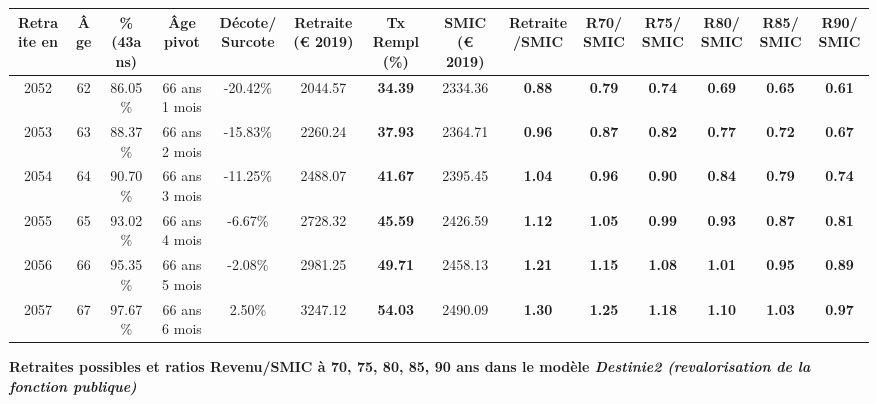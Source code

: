 \begin{adjustbox}{max width=\textwidth} 
\begin{tabular}[htb]{|c|c||c|c|c||c|c||c|c||c|c|c|c|c|} 
\hline 
 Retraite en &  Âge &  \%(43ans) &  Âge pivot &  Décote/Surcote &  Retraite (\euro{} 2019) &  Tx Rempl(\%) &  SMIC (\euro{} 2019) &  Retraite/SMIC &  R70/SMIC &  R75/SMIC &  R80/SMIC &  R85/SMIC &  R90/SMIC \\ 
\hline \hline 
 2052 &  62 &  86.05\% &  66 ans 1 mois &  -20.42\% &  2044.57 &  {\bf 34.39} &  2334.36 &  {\bf {\color{red} 0.88}} &  {\bf {\color{red} 0.79}} &  {\bf {\color{red} 0.74}} &  {\bf {\color{red} 0.69}} &  {\bf {\color{red} 0.65}} &  {\bf {\color{red} 0.61}} \\ 
\hline 
 2053 &  63 &  88.37\% &  66 ans 2 mois &  -15.83\% &  2260.24 &  {\bf 37.93} &  2364.71 &  {\bf {\color{red} 0.96}} &  {\bf {\color{red} 0.87}} &  {\bf {\color{red} 0.82}} &  {\bf {\color{red} 0.77}} &  {\bf {\color{red} 0.72}} &  {\bf {\color{red} 0.67}} \\ 
\hline 
 2054 &  64 &  90.70\% &  66 ans 3 mois &  -11.25\% &  2488.07 &  {\bf 41.67} &  2395.45 &  {\bf 1.04} &  {\bf {\color{red} 0.96}} &  {\bf {\color{red} 0.90}} &  {\bf {\color{red} 0.84}} &  {\bf {\color{red} 0.79}} &  {\bf {\color{red} 0.74}} \\ 
\hline 
 2055 &  65 &  93.02\% &  66 ans 4 mois &  -6.67\% &  2728.32 &  {\bf 45.59} &  2426.59 &  {\bf 1.12} &  {\bf 1.05} &  {\bf {\color{red} 0.99}} &  {\bf {\color{red} 0.93}} &  {\bf {\color{red} 0.87}} &  {\bf {\color{red} 0.81}} \\ 
\hline 
 2056 &  66 &  95.35\% &  66 ans 5 mois &  -2.08\% &  2981.25 &  {\bf 49.71} &  2458.13 &  {\bf 1.21} &  {\bf 1.15} &  {\bf 1.08} &  {\bf 1.01} &  {\bf {\color{red} 0.95}} &  {\bf {\color{red} 0.89}} \\ 
\hline 
 2057 &  67 &  97.67\% &  66 ans 6 mois &  2.50\% &  3247.12 &  {\bf 54.03} &  2490.09 &  {\bf 1.30} &  {\bf 1.25} &  {\bf 1.18} &  {\bf 1.10} &  {\bf 1.03} &  {\bf {\color{red} 0.97}} \\ 
\hline 
\hline 
\end{tabular} 
\end{adjustbox} 
 
 \vspace{0.1cm} 
{\bf \noindent Retraites possibles et ratios Revenu/SMIC à 70, 75, 80, 85, 90 ans dans le modèle \emph{Destinie2 (revalorisation de la fonction publique)}}  
 

